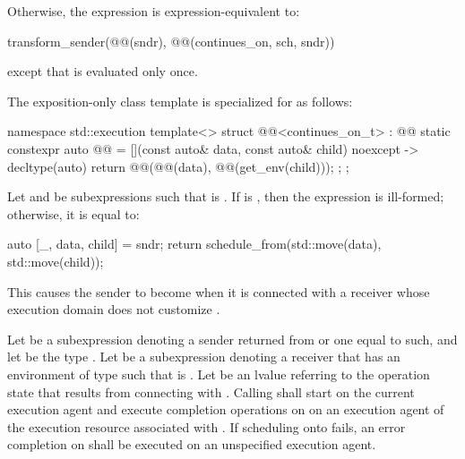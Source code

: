 \pnum
Otherwise,
the expression  is expression-equivalent to:
\begin{codeblock}
transform_sender(@@(sndr), @@(continues_on, sch, sndr))
\end{codeblock}
except that  is evaluated only once.

\pnum
The exposition-only class template 
is specialized for  as follows:
\begin{codeblock}
namespace std::execution {
  template<>
  struct @@<continues_on_t> : @@ {
    static constexpr auto @@ =
      [](const auto& data, const auto& child) noexcept -> decltype(auto) {
        return @@(@@(data), @@(get_env(child)));
      };
  };
}
\end{codeblock}

\pnum
Let  and  be subexpressions
such that  is .
If  is ,
then
the expression  is ill-formed;
otherwise, it is equal to:
\begin{codeblock}
auto [_, data, child] = sndr;
return schedule_from(std::move(data), std::move(child));
\end{codeblock}
\begin{note}
This causes the  sender to become
 when it is connected with a receiver
whose execution domain does not customize .
\end{note}

\pnum
Let  be a subexpression denoting
a sender returned from  or one equal to such, and
let  be the type .
Let  be a subexpression denoting a receiver
that has an environment of type 
such that  is .
Let  be an lvalue referring to the operation state
that results from connecting  with .
Calling  shall
start  on the current execution agent and
execute completion operations on 
on an execution agent of the execution resource associated with .
If scheduling onto  fails,
an error completion on  shall be executed
on an unspecified execution agent.

